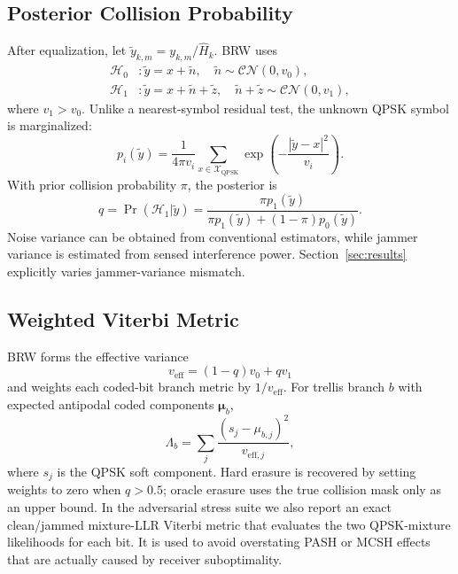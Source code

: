 \documentclass[journal,10pt]{IEEEtran}
\begin{document}
\subsection{Posterior Collision Probability}
After equalization, let $\widetilde y_{k,m}=y_{k,m}/\widehat H_k$. BRW uses
\begin{align}
\mathcal{H}_0 &: \widetilde y=x+\widetilde n,\quad
\widetilde n\sim\mathcal{CN}(0,v_0),\\
\mathcal{H}_1 &: \widetilde y=x+\widetilde n+\widetilde z,\quad
\widetilde n+\widetilde z\sim\mathcal{CN}(0,v_1),
\end{align}
where $v_1>v_0$. Unlike a nearest-symbol residual test, the unknown QPSK symbol
is marginalized:
\begin{equation}
p_i(\widetilde y)=\frac{1}{4\pi v_i}
\sum_{x\in\mathcal{X}_{\mathrm{QPSK}}}
\exp\left(-\frac{|\widetilde y-x|^2}{v_i}\right).
\label{eq:likelihood}
\end{equation}
With prior collision probability $\pi$, the posterior is
\begin{equation}
q=\Pr(\mathcal{H}_1|\widetilde y)
=\frac{\pi p_1(\widetilde y)}
{\pi p_1(\widetilde y)+(1-\pi)p_0(\widetilde y)}.
\label{eq:posterior}
\end{equation}
Noise variance can be obtained from conventional estimators, while jammer
variance is estimated from sensed interference power. Section~\ref{sec:results}
explicitly varies jammer-variance mismatch.

\subsection{Weighted Viterbi Metric}
BRW forms the effective variance
\begin{equation}
v_{\mathrm{eff}}=(1-q)v_0+qv_1
\label{eq:veff}
\end{equation}
and weights each coded-bit branch metric by $1/v_{\mathrm{eff}}$. For trellis
branch $b$ with expected antipodal coded components $\boldsymbol\mu_b$,
\begin{equation}
\Lambda_b=\sum_j
\frac{(s_j-\mu_{b,j})^2}{v_{\mathrm{eff},j}},
\label{eq:metric}
\end{equation}
where $s_j$ is the QPSK soft component. Hard erasure is recovered by setting
weights to zero when $q>0.5$; oracle erasure uses the true collision mask only
as an upper bound. In the adversarial stress suite we also report an exact
clean/jammed mixture-LLR Viterbi metric that evaluates the two QPSK-mixture
likelihoods for each bit. It is used to avoid overstating PASH or MCSH effects
that are actually caused by receiver suboptimality.
\end{document}
